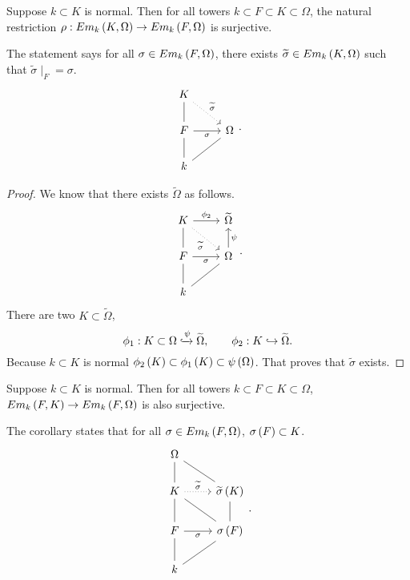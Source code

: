 \begin{lemma}
Suppose $ k \subset K $ is normal. Then for all towers $ k \subset F \subset K \subset \Omega $, the natural restriction $ \rho : Em_k\left( K, \Omega \right) \to Em_k\left( F, \Omega \right) $ is surjective.
\end{lemma}


The statement says for all $ \sigma \in Em_k\left( F, \Omega \right) $, there exists $ \widetilde{\sigma} \in Em_k\left( K, \Omega \right) $ such that $ \widetilde{\sigma} \mid_F = \sigma $.
$$
\begin{tikzcd}
K \arrow[dotted]{dr}{\widetilde{\sigma}} & \\
F \arrow[dash]{u} \arrow[swap]{r}{\sigma} & \Omega \\
k \arrow[dash]{u} \arrow[dash]{ur} &
\end{tikzcd}.
$$

\begin{proof}
We know that there exists $ \widetilde{\Omega} $ as follows.
$$
\begin{tikzcd}
K \arrow{r}{\phi_2} \arrow[dotted, swap]{dr}{\widetilde{\sigma}} & \widetilde{\Omega} \\
F \arrow[dash]{u} \arrow[swap]{r}{\sigma} & \Omega \arrow[swap]{u}{\psi} \\
k \arrow[dash]{u} \arrow[dash]{ur} &
\end{tikzcd}.
$$
There are two $ K \subset \widetilde{\Omega} $,
$$
\phi_1 : K \subset \Omega \xhookrightarrow{\psi} \widetilde{\Omega}, \qquad \phi_2 : K \hookrightarrow \widetilde{\Omega}.
$$
Because $ k \subset K $ is normal $ \phi_2\left( K \right) \subset \phi_1\left( K \right) \subset \psi\left( \Omega \right) $. That proves that $ \widetilde{\sigma} $ exists.
\end{proof}

\begin{corollary}
Suppose $ k \subset K $ is normal. Then for all towers $ k \subset F \subset K \subset \Omega $, $ Em_k\left( F, K \right) \to Em_k\left( F, \Omega \right) $ is also surjective.
\end{corollary}

The corollary states that for all $ \sigma \in Em_k\left( F, \Omega \right) $, $ \sigma\left( F \right) \subset K $.
$$
\begin{tikzcd}
\Omega & \\
K \arrow[dash]{u} \arrow[dotted]{r}{\widetilde{\sigma}} & \widetilde{\sigma}\rb{K} \arrow[dash]{ul} \\
F \arrow[dash]{u} \arrow[swap]{r}{\sigma} & \sigma\rb{F} \arrow[dash]{ul} \arrow[dash]{u} \\
k \arrow[dash]{u} \arrow[dash]{ur} &
\end{tikzcd}.
$$

